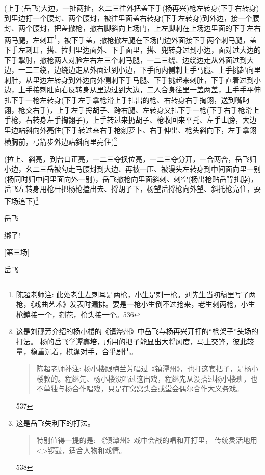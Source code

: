 {{{(上手(岳飞)大边，一扯两扯，幺二三往外把盖下手(杨再兴)枪左转身(下手右转身)到里边打一个腰封、两个腰封，被往里面盖右转身(下手左转身)到外边，接一个腰封、两个腰封，把盖撤枪，撤右脚斜向上场门，上左脚刺在上场边里面的下手左右两马腿，左刺耳\footnote{ 陈超老师注: 此处{老生左刺耳是两枪}，{小生是刺一枪}。刘先生当初稿里写了两枪，《戏曲艺术》发表时漏排。要是一枪小生倒不过抢来，老生刺两枪，小生枪鐏接一个，剜花，枪头接一个。{536}}，被下手盖，撤枪撤左腿在下场门边外面接下手两个刺马腿，盖下手左刺耳，搭、拉归里边面外、下手面里，搭、兜转身过到小边，面对过大边的下手掣肘，撤枪两人对脸左右左三个刺马腿，一二三绕、边绕边走从外面过到大边，一二三绕，边绕边走从外面过到小边，下手向内侧刺上手马腿、上手挑起向里刺肚，从里边左转身到外边向外侧刺下手马腿、下手挑起来刺肚，下手直着过到小边，上手接刺肚向右反转身从里边过到大边，二人合身往里一盖两盖，上手手平伸扎下手一枪左转身(下手左手拿枪滑上手扎出的枪、右转身右手掏翎，送到嘴叼翎，枪交右手)，上手左手捋胡子、跨右腿、左转身又扎下手一枪(下手右手枪滑上手枪，右转身左手掏翎子)，上手转过来扔胡子、枪收回来平托、左手山膀，大边里边站斜向外亮住(下手转过来右手枪剜萝卜、右手伸出、枪头斜向下，左手拿翎横胸前，弓箭步外边站斜向里亮住)\footnote{ 这是刘砚芳介绍的杨小楼的《镇潭州》中岳飞与杨再兴开打的``枪架子''头场的打法。  杨的岳飞学谭鑫培，所用的把子能显出大将风度，马上交锋，彼此较量，稳重沉着，棋逢对手，合乎剧情。  \begin{quote}  陈超老师补注: 杨小楼跟梅兰芳唱过《镇潭州》，也打这套把子，是杨小楼教的。程继先、杨小楼没唱过这出戏，程继先从没搭过杨小楼班，也不单独与杨合作唱戏，只是在窝窝头会或堂会偶尔合作大义务戏。  \end{quote}  {537}}

(拉上、斜亮，到台口正亮，一二三夺换位亮，一二三夺分开，一合两合，岳飞归小边，幺二三岳被勾走马腰封到大边、再被一压、被漫头左转身到中间面向里一别(杨同时归中间里面向外一别)，岳飞撤枪向里面斜刺、刺空(杨出枪贴岳背扎脖)，岳飞左转身用枪杆把杨枪搕出去、捋胡子下，杨望岳捋枪向外望、斜托枪亮住，耍下场追下)\footnote{ 这是岳飞失利下的打法。  \begin{quote}  {特别值得一提的是: 《镇潭州》戏中会战的唱和开打里，  传统灵活地用}\textless{}\!\textgreater{}{锣鼓，适合人物和戏情。}  \end{quote}  {538}}

{岳飞\hspace{30pt}~

绑了!}

{{[}第三场{]}}

{岳飞\hspace{30pt}~

}}}}
